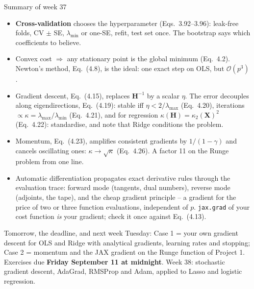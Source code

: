 \documentclass[10pt,aspectratio=169]{beamer}
\begin{document}
\begin{frame}{Summary of week 37}
\small
\begin{itemize}
  \item \textbf{Cross-validation} chooses the hyperparameter (Eqs.~3.92--3.96):
        leak-free folds, CV $\pm$ SE, $\lambda_{\min}$ or one-SE, refit,
        test set once.  The bootstrap says which coefficients to believe.
  \item Convex cost $\Rightarrow$ any stationary point is the global minimum
        (Eq.~4.2).  Newton's method, Eq.~(4.8), is the ideal: one exact step
        on OLS, but $\mathcal{O}(p^3)$.
  \item Gradient descent, Eq.~(4.15), replaces $\bm{H}^{-1}$ by a scalar
        $\eta$.  The error decouples along eigendirections, Eq.~(4.19):
        stable iff $\eta<2/\lambda_{\max}$ (Eq.~4.20), iterations
        $\propto\kappa=\lambda_{\max}/\lambda_{\min}$ (Eq.~4.21), and for
        regression $\kappa(\bm{H})=\kappa_2(\bm{X})^2$ (Eq.~4.22): standardise,
        and note that Ridge conditions the problem.
  \item Momentum, Eq.~(4.23), amplifies consistent gradients by
        $1/(1-\gamma)$ and cancels oscillating ones: $\kappa\to\sqrt\kappa$
        (Eq.~4.26).  A factor 11 on the Runge problem from one line.
  \item Automatic differentiation propagates exact derivative rules through
        the evaluation trace: forward mode (tangents, dual numbers), reverse
        mode (adjoints, the tape), and the cheap gradient principle -- a
        gradient for the price of two or three function evaluations,
        independent of $p$.  \texttt{jax.grad} of your cost function
        \emph{is} your gradient; check it once against Eq.~(4.13).
\end{itemize}
\begin{block}{Tomorrow, the deadline, and next week}
Tuesday: Case 1 = your own gradient descent for OLS and Ridge with analytical
gradients, learning rates and stopping; Case 2 = momentum and the JAX
gradient on the Runge function of Project 1.  Exercises due \textbf{Friday
September 11 at midnight}.  Week 38: stochastic gradient descent, AdaGrad,
RMSProp and Adam, applied to Lasso and logistic regression.
\end{block}
\end{frame}
\end{document}
